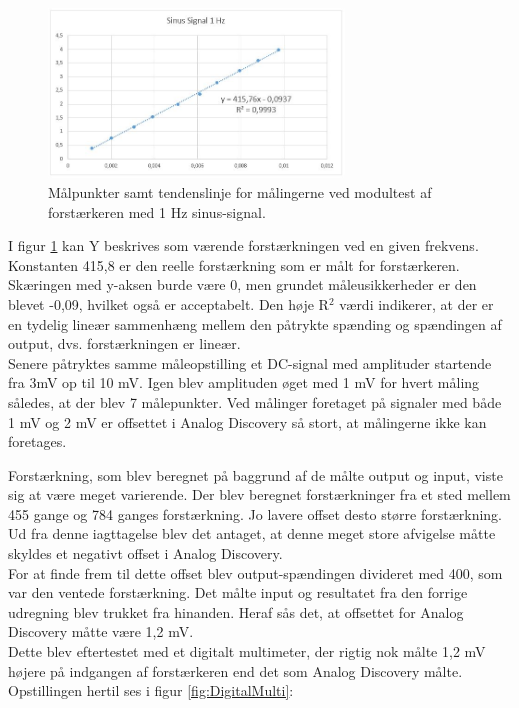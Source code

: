 \begin{figure}[H]
	\centering
	\includegraphics[width=0.7\textwidth]{Figurer/Hardware/Sinusforstaerker}
	\caption{Målpunkter samt tendenslinje for målingerne ved modultest af forstærkeren med 1 Hz sinus-signal.}
	\label{fig:SinusModul}
\end{figure}


I figur \ref{fig:SinusModul} kan Y beskrives som værende forstærkningen ved en given frekvens. Konstanten 415,8 er den reelle forstærkning som er målt for forstærkeren. Skæringen med y-aksen burde være 0, men grundet måleusikkerheder er den blevet -0,09, hvilket også er acceptabelt. Den høje R$^2$ værdi indikerer, at der er en tydelig lineær sammenhæng mellem den påtrykte spænding og spændingen af output, dvs. forstærkningen er lineær.\\[1ex]
Senere påtryktes samme måleopstilling et DC-signal med amplituder startende fra 3mV op til 10 mV. Igen blev amplituden øget med 1 mV for hvert måling således, at der blev 7 målepunkter. Ved målinger foretaget på signaler med både 1 mV og 2 mV er offsettet i Analog Discovery så stort, at målingerne ikke kan foretages.

Forstærkning, som blev beregnet på baggrund af de målte output og input, viste sig at være meget varierende. Der blev beregnet forstærkninger fra et sted mellem 455 gange og 784 ganges forstærkning. Jo lavere offset desto større forstærkning. Ud fra denne iagttagelse blev det antaget, at denne meget store afvigelse måtte skyldes et negativt offset i Analog Discovery. 
\\For at finde frem til dette offset blev output-spændingen divideret med 400, som var den ventede forstærkning. Det målte input og resultatet fra den forrige udregning blev trukket fra hinanden. Heraf sås det, at offsettet for Analog Discovery måtte være 1,2 mV.\\
Dette blev eftertestet med et digitalt multimeter, der rigtig nok målte 1,2 mV højere på indgangen af forstærkeren end det som Analog Discovery målte. Opstillingen hertil ses i figur \ref{fig:DigitalMulti}:


